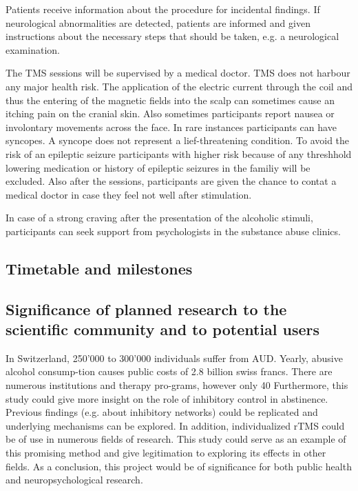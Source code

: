 \documentclass[12pt]{article}
\begin{document}
Patients receive information about the procedure for incidental findings. If neurological abnormalities are detected, patients are informed and given instructions about the necessary steps that should be taken, e.g. a neurological examination.

The TMS sessions will be supervised by a medical doctor. TMS does not harbour any major health risk. The application of the electric current through the coil and thus the entering of the magnetic fields into the scalp can sometimes cause an itching pain on the cranial skin. Also sometimes participants report nausea or involontary movements across the face. In rare instances participants can have syncopes. A syncope does not represent a lief-threatening condition. To avoid the risk of an epileptic seizure participants with higher risk because of any threshhold lowering medication or history of epileptic seizures in the familiy will be excluded. Also after the sessions, participants are given the chance to contat a medical doctor in case they feel not well after stimulation. 

In case of a strong craving after the presentation of the alcoholic stimuli, participants can seek support from psychologists in the substance abuse clinics.
 

\subsection{Timetable and milestones}


\subsection{Significance of planned research to the scientific community and to potential users}
In Switzerland, 250’000 to 300’000 individuals suffer from AUD. Yearly, abusive alcohol consump-tion causes public costs of 2.8 billion swiss francs. There are numerous institutions and therapy pro-grams, however only 40%
Furthermore, this study could give more insight on the role of inhibitory control in abstinence. Previous findings (e.g. about inhibitory networks) could be replicated and underlying mechanisms can be explored.
In addition, individualized rTMS could be of use in numerous fields of research. This study could serve as an example of this promising method and give legitimation to exploring its effects in other fields.
As a conclusion, this project would be of significance for both public health and neuropsychological research.



\printbibliography  
\end{document}
